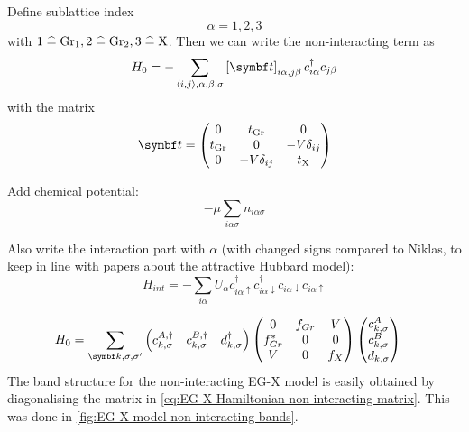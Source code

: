 \documentclass[../notes.tex]{subfiles}
\begin{document}

Define sublattice index
\begin{equation}
	\alpha = 1, 2, 3
\end{equation}
with \(1 \mathrel{\widehat{=}} \mathrm{Gr}_1, 2 \mathrel{\widehat{=}} \mathrm{Gr}_2, 3 \mathrel{\widehat{=}} \mathrm{X}\).
Then we can write the non-interacting term as
\begin{equation}
	H_0 = - \sum_{\langle i, j \rangle, \alpha, \beta, \sigma} \left[\mat{t} \right]_{i\alpha,j\beta} c_{i\alpha}^{\dagger} c_{j\beta}
\end{equation}
with the matrix
\begin{equation}
	\mat{t} = \begin{pmatrix}
		0 & t_{\mathrm{Gr}} & 0 \\
		t_{\mathrm{Gr}} & 0 & -V \delta_{ij} \\
		0 & -V \delta_{ij} & t_{\mathrm{X}} \\
	\end{pmatrix}
\end{equation}

Add chemical potential:
\begin{equation}
	-\mu \sum_{i \alpha \sigma} n_{i \alpha \sigma}
\end{equation}

Also write the interaction part with \(\alpha\) (with changed signs compared to Niklas, to keep in line with papers about the attractive Hubbard model):
\begin{equation}
	H_{int} = - \sum_{i \alpha} U_{\alpha} c_{i\alpha \uparrow}^{\dagger} c_{i\alpha \downarrow}^{\dagger} c_{i\alpha \downarrow} c_{i\alpha \uparrow}
\end{equation}

\begin{align}
	H_0 &= \sum_{\vb{k}, \sigma, \sigma^{\prime}} \begin{pmatrix} c_{k, \sigma}^{A, \dagger} & c_{k, \sigma}^{B, \dagger} & d_{k, \sigma}^{\dagger} \end{pmatrix}
	\begin{pmatrix}
		0 & f_{Gr} & V \\
		f_{Gr}^* & 0 & 0 \\
		V & 0 & f_{X}
	\end{pmatrix} \begin{pmatrix} c_{k, \sigma}^{A} \\ c_{k, \sigma}^{B} \\ d_{k, \sigma} \end{pmatrix}
	\label{eq:EG-X Hamiltonian non-interacting matrix}
\end{align}
The band structure for the non-interacting EG-X model is easily obtained by diagonalising the matrix in \cref{eq:EG-X Hamiltonian non-interacting matrix}.
This was done in \cref{fig:EG-X model non-interacting bands}.
\end{document}
